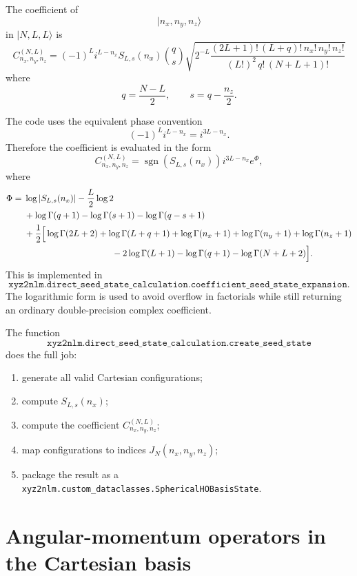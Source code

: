 \documentclass[11pt]{article}
\begin{document}
The coefficient of
\[
    |n_x,n_y,n_z\rangle
\]
in \(|N,L,L\rangle\) is
\[
    \boxed{
    C^{(N,L)}_{n_x,n_y,n_z}
    =
    (-1)^L i^{L-n_x}
    S_{L,s}(n_x)
    \binom{q}{s}
    \sqrt{
    2^{-L}
    \frac{
        (2L+1)!\,(L+q)!\,n_x!\,n_y!\,n_z!
    }{
        (L!)^2\,q!\,(N+L+1)!
    }}
    }
\]
where
\[
    q=\frac{N-L}{2},
    \qquad
    s=q-\frac{n_z}{2}.
\]

The code uses the equivalent phase convention
\[
    (-1)^L i^{L-n_x}
    =
    i^{3L-n_x}.
\]
Therefore the coefficient is evaluated in the form
\[
    C^{(N,L)}_{n_x,n_y,n_z}
    =
    \operatorname{sgn}\!\left(S_{L,s}(n_x)\right)
    i^{3L-n_x}
    e^\Phi ,
\]
where
\[
\begin{aligned}
    \Phi
    ={}&
    \log\left|S_{L,s}(n_x)\right|
    -\frac{L}{2}\log 2
    \\
    &+
    \log\Gamma(q+1)
    -\log\Gamma(s+1)
    -\log\Gamma(q-s+1)
    \\
    &+
    \frac{1}{2}
    \Big[
        \log\Gamma(2L+2)
        +\log\Gamma(L+q+1)
        +\log\Gamma(n_x+1)
        +\log\Gamma(n_y+1)
        +\log\Gamma(n_z+1)
    \\
    &\hspace{3.5cm}
        -2\log\Gamma(L+1)
        -\log\Gamma(q+1)
        -\log\Gamma(N+L+2)
    \Big].
\end{aligned}
\]
This is implemented in
\[
    \texttt{xyz2nlm.direct\_seed\_state\_calculation.coefficient\_seed\_state\_expansion}.
\]
The logarithmic form is used to avoid overflow in factorials while still
returning an ordinary double-precision complex coefficient.

The function
\[
    \texttt{xyz2nlm.direct\_seed\_state\_calculation.create\_seed\_state}
\]
does the full job:
\begin{enumerate}
    \item generate all valid Cartesian configurations;
    \item compute \(S_{L,s}(n_x)\);
    \item compute the coefficient \(C^{(N,L)}_{n_x,n_y,n_z}\);
    \item map configurations to indices \(J_N(n_x,n_y,n_z)\);
    \item package the result as a
    \texttt{xyz2nlm.custom\_dataclasses.SphericalHOBasisState}.
\end{enumerate}

\section{Angular-momentum operators in the Cartesian basis}
\end{document}
